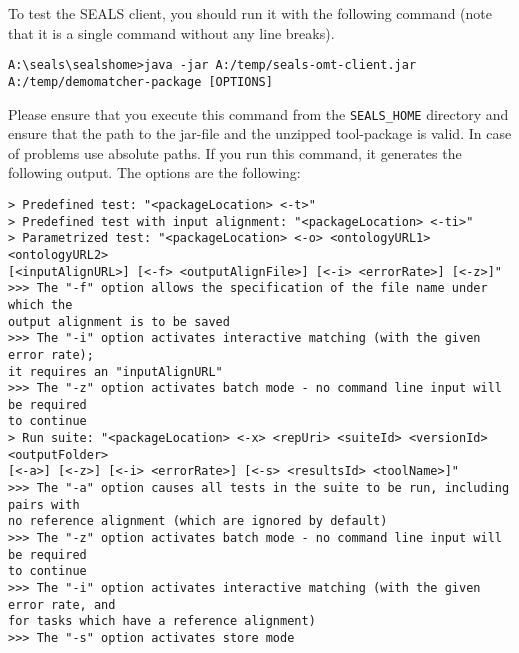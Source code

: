 \documentclass{article}
\begin{document}
To test the SEALS client, you should run it with the following command (note that it is a single command without any line breaks).
\begin{verbatim}
A:\seals\sealshome>java -jar A:/temp/seals-omt-client.jar
A:/temp/demomatcher-package [OPTIONS]
\end{verbatim}
Please ensure that you execute this command from the \verb|SEALS_HOME| directory and ensure that the path to the jar-file and the unzipped tool-package is valid. In case of problems use absolute paths. If you run this command, it generates the following output.
The options are the following:
\small
\begin{verbatim}
> Predefined test: "<packageLocation> <-t>"
> Predefined test with input alignment: "<packageLocation> <-ti>"
> Parametrized test: "<packageLocation> <-o> <ontologyURL1> <ontologyURL2>
[<inputAlignURL>] [<-f> <outputAlignFile>] [<-i> <errorRate>] [<-z>]"
>>> The "-f" option allows the specification of the file name under which the
output alignment is to be saved
>>> The "-i" option activates interactive matching (with the given error rate);
it requires an "inputAlignURL"
>>> The "-z" option activates batch mode - no command line input will be required
to continue
> Run suite: "<packageLocation> <-x> <repUri> <suiteId> <versionId> <outputFolder>
[<-a>] [<-z>] [<-i> <errorRate>] [<-s> <resultsId> <toolName>]"
>>> The "-a" option causes all tests in the suite to be run, including pairs with
no reference alignment (which are ignored by default)
>>> The "-z" option activates batch mode - no command line input will be required
to continue
>>> The "-i" option activates interactive matching (with the given error rate, and
for tasks which have a reference alignment)
>>> The "-s" option activates store mode
\end{verbatim}
\normalsize
\end{document}
